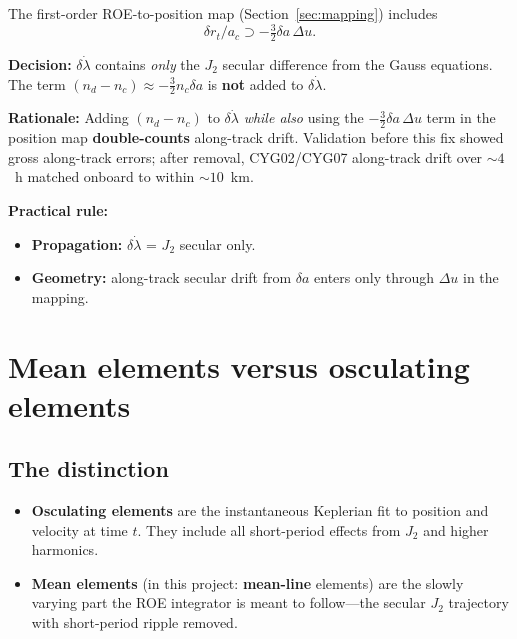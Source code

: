 \documentclass[11pt]{article}
\begin{document}
The first-order ROE-to-position map (Section~\ref{sec:mapping}) includes
\begin{equation}
\delta r_t/a_c \supset -\tfrac{3}{2}\delta a\,\Delta u.
\end{equation}

\textbf{Decision:} $\delta\dot\lambda$ contains \emph{only} the $J_2$ secular difference from the Gauss equations. The term $(n_d - n_c) \approx -\tfrac{3}{2} n_c \delta a$ is \textbf{not} added to $\delta\dot\lambda$.

\textbf{Rationale:} Adding $(n_d-n_c)$ to $\delta\dot\lambda$ \emph{while also} using the $-\tfrac{3}{2}\delta a\,\Delta u$ term in the position map \textbf{double-counts} along-track drift. Validation before this fix showed gross along-track errors; after removal, CYG02/CYG07 along-track drift over $\sim 4$~h matched onboard to within $\sim 10$~km.

\textbf{Practical rule:}
\begin{itemize}
    \item \textbf{Propagation:} $\delta\dot\lambda$ = $J_2$ secular only.
    \item \textbf{Geometry:} along-track secular drift from $\delta a$ enters only through $\Delta u$ in the mapping.
\end{itemize}

\section{Mean elements versus osculating elements}

\subsection{The distinction}

\begin{itemize}
    \item \textbf{Osculating elements} are the instantaneous Keplerian fit to position and velocity at time $t$. They include all short-period effects from $J_2$ and higher harmonics.
    \item \textbf{Mean elements} (in this project: \textbf{mean-line} elements) are the slowly varying part the ROE integrator is meant to follow---the secular $J_2$ trajectory with short-period ripple removed.
\end{itemize}
\end{document}
